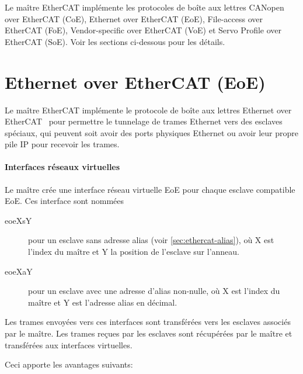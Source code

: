 \documentclass[a4paper,12pt,BCOR6mm,bibtotoc,idxtotoc]{scrbook}
\begin{document}
Le ma\^itre EtherCAT impl\'emente les protocoles de bo\^ite aux
lettres CANopen over EtherCAT (CoE), Ethernet over EtherCAT (EoE),
File-access over EtherCAT (FoE), Vendor-specific over EtherCAT (VoE)
et Servo Profile over EtherCAT (SoE).  Voir les sections ci-dessous
pour les d\'etails.


\section{Ethernet over EtherCAT (EoE)}
\label{sec:eoe}

Le ma\^itre EtherCAT impl\'emente le protocole de bo\^ite aux lettres
Ethernet over EtherCAT~\cite[sec.~5.7]{alspec} pour permettre le
tunnelage de trames Ethernet vers des esclaves sp\'eciaux, qui peuvent
soit avoir des ports physiques Ethernet ou avoir leur propre pile IP
pour recevoir les trames.

\paragraph{Interfaces r\'eseaux virtuelles}

Le ma\^itre cr\'ee une interface r\'eseau virtuelle EoE pour chaque
esclave compatible EoE. Ces interface sont nomm\'ees

\begin{description}

\item[eoeXsY] pour un esclave sans adresse alias (voir
  \autoref{sec:ethercat-alias}), o\`u X est l'index du ma\^itre et Y
  la position de l'esclave sur l'anneau.

\item[eoeXaY] pour un esclave avec une adresse d'alias non-nulle, o\`u
  X est l'index du ma\^itre et Y est l'adresse alias en d\'ecimal.

\end{description}

Les trames envoy\'ees vers ces interfaces sont transf\'er\'ees vers les
esclaves associ\'es par le ma\^itre. Les trames re\c{c}ues par les esclaves
sont r\'ecup\'er\'ees par le ma\^itre et transf\'er\'ees aux interfaces
virtuelles.

Ceci apporte les avantages suivants:
\end{document}
